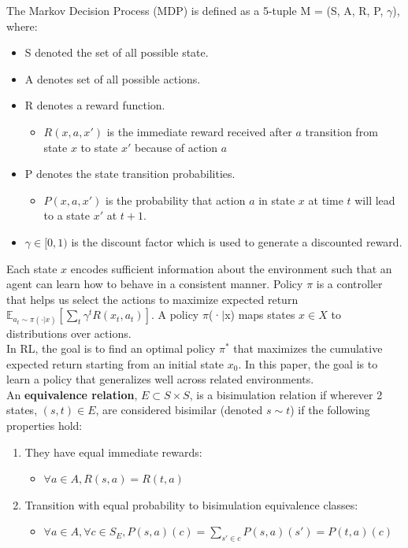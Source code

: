 \documentclass{usiinftr}
\begin{document}
The Markov Decision Process (MDP) is defined as a 5-tuple M = (S, A, R, P, $\gamma$), where:
\begin{itemize}
    \item S denoted the set of all possible state.
    \item A denotes set of all possible actions.
    \item R denotes a reward function.
    \begin{itemize}
        \item $R(x,a,x')$ is the immediate reward received after $a$ transition from state $x$ to state $x'$ because of action $a$
    \end{itemize}
    \item P denotes the state transition probabilities.
    \begin{itemize}
        \item $P(x,a,x')$ is the probability that action $a$ in state $x$ at time $t$ will lead to a state $x'$ at $t+1$.
    \end{itemize}
    \item $\gamma \in  [0, 1)$  is the discount factor which is used to generate a discounted reward. \cite{puterman2005markov}
\end{itemize}

Each state $x$ encodes sufficient information about the environment such that an agent can learn how to behave in a consistent manner. Policy $\pi$ is a controller that helps us select the actions to maximize expected return $\mathbb{E}_{a_{t}\sim \pi(\cdot|x)} [\sum_t \gamma^t R(x_t,a_t)]$. A policy $\pi$(·$|$x) maps states $x \in X$ to distributions over actions. \\

In RL, the goal is to find an optimal policy $\pi^*$ that maximizes the cumulative expected return starting from an initial state $x_0$. In this paper, the goal is to learn a policy that generalizes well across related environments. \cite{agarwal2021contrastive}
 \\

An \textbf{equivalence relation}, $E \subset S \times S$, is a bisimulation relation if wherever 2 states, $(s,t) \in E$, are considered bisimilar (denoted $s \sim t$) if the following properties hold:

\begin{enumerate}
    \item They have equal immediate rewards: 
    \begin{itemize}
        \item $\forall a \in A, R(s,a) = R(t,a)$
    \end{itemize}
    \item Transition with equal probability to bisimulation equivalence classes:
    \begin{itemize}
        \item $\forall a \in A, \forall c \in S_E, P(s,a)(c) = \sum_{s'\in c} P(s,a)(s') = P(t,a)(c)$ \cite{castro2020scalable}
    \end{itemize}
\end{enumerate}
\end{document}
